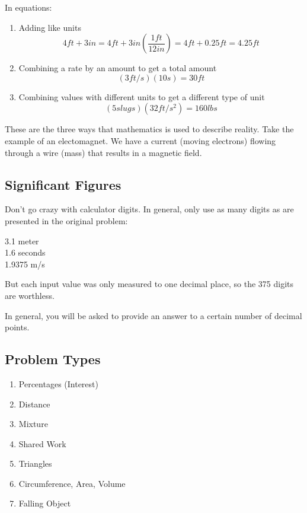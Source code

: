 \documentclass[letterpaper,12pt,fleqn]{article}
\begin{document}
In equations:
\begin{enumerate}
\item Adding like units
  \[4ft+3in=4ft+3in\left(\frac{1ft}{12in}\right)=4ft+0.25ft=4.25ft\]

\item Combining a rate by an amount to get a total amount
  \[(3ft/s)(10s)=30ft\]

\item Combining values with different units to get a different type of unit
  \[(5 slugs)(32 ft/s^2)=160 lbs\]
\end{enumerate}

These are the three ways that mathematics is used to describe reality. Take the
example of an electomagnet. We have a current (moving electrons) flowing
through a wire (mass) that results in a magnetic field.

\subsection*{Significant Figures}

Don't go crazy with calculator digits. In general, only use as many digits as
are presented in the original problem:

3.1 meter \\
1.6 seconds \\
1.9375 m/s

But each input value was only measured to one decimal place, so the 375 digits
are worthless.

In general, you will be asked to provide an answer to a certain number of
decimal points.

\subsection*{Problem Types}

\begin{enumerate}
\item Percentages (Interest)
\item Distance
\item Mixture
\item Shared Work
\item Triangles
\item Circumference, Area, Volume
\item Falling Object
\end{enumerate}
\end{document}
